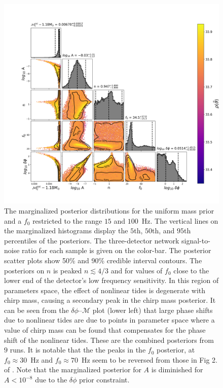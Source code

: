 


\begin{figure}[th]
\includegraphics[width=\columnwidth]{figs/chapter6/combined_uni_dphi_cut_combined.png}
\caption{The marginalized posterior distributions for the uniform mass prior and a $f_0$ restricted to the range $15$ and $100$~Hz. The vertical lines on the marginalized histograms display the $5$th, $50$th, and $95$th percentiles of the posteriors. The three-detector network signal-to-noise ratio for each sample is given on the color-bar. The posterior scatter plots show 50\% and 90\% credible interval contours. The posteriors on $n$ is peaked $n \lesssim 4/3$ and for values of $f_0$ close to the lower end of the detector's low frequency sensitivity. In this region of parameters space, the effect of nonlinear tides is degenerate with chirp mass, causing a secondary peak in the chirp mass posterior. It can be seen from the $\delta\phi$--$\mathcal{M}$ plot (lower left) that large phase shifts due to nonlinear tides are due to points in parameter space where a value of chirp mass can be found that compensates for the phase shift of the nonlinear tides. These are the combined posteriors from $9$ runs. It is notable that the the peaks in the $f_0$ posterior, at $f_0 \approx 30$~Hz and $f_0 \approx 70$~Hz seem to be reversed from those in Fig 2. of \citep{abbott2019constraining}. Note that the marginalized posterior for $A$ is diminished for $A < 10^{-8}$ due to the $\delta \phi$ prior constraint.
}
\label{fig:uniform_f0_small}
\end{figure}

